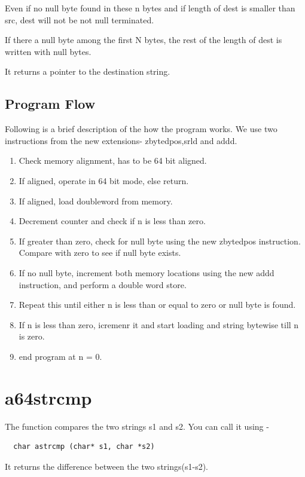 \documentclass[12pt]{article}
\begin{document}
Even if no null byte found in these n bytes and if length of dest is smaller than src, dest will not be not null terminated.

If there a null byte among the first N bytes, the rest of the length of dest is written with null bytes.


It returns a pointer to the destination string.


\subsection{Program Flow}

Following is a brief description of the how the program works. We use two instructions from the new extensions- zbytedpos,srld and addd. 


\begin{enumerate}
   \item Check memory alignment, has to be 64 bit aligned.
    \item If aligned, operate in 64 bit mode, else return.
    \item If aligned, load doubleword from memory.
    \item Decrement counter and check if n is less than zero.
    \item If greater than zero, check for null byte using the new zbytedpos instruction. Compare with zero to see if null byte exists.
    \item If no null byte, increment both memory locations using the new addd instruction, and perform a double word store.
    \item Repeat this until either n is less than or equal to zero or null byte is found.
    \item If n is less than zero, icremenr it and start loading and string bytewise till n is zero.
    \item end program at n = 0.
 
\end{enumerate}

\section{a64strcmp}
The function  compares  the two strings s1 and s2. You can call it using -
\begin{verbatim}
  char astrcmp (char* s1, char *s2)  
\end{verbatim}
It returns the difference between the two strings(s1-s2).
\end{document}
